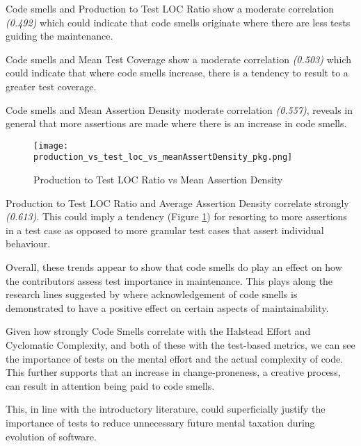 Code smells and Production to Test LOC Ratio show a moderate correlation \textit{(0.492)} which could indicate that code smells originate where there are less tests guiding the maintenance. 

Code smells and Mean Test Coverage show a moderate correlation \textit{(0.503)} which could indicate that where code smells increase, there is a tendency to result to a greater test coverage. 

Code smells and Mean Assertion Density moderate correlation \textit{(0.557)}, reveals in general that more assertions are made where there is an increase in code smells. 

\begin{figure}[H]
	\texttt{[image: production\_vs\_test\_loc\_vs\_meanAssertDensity\_pkg.png]}
	\caption{Production to Test LOC Ratio vs Mean Assertion Density}
	\label{fig:prodtestRatioVsMeanAssertDensity}  
\end{figure}

Production to Test LOC Ratio and Average Assertion Density correlate strongly \textit{(0.613)}. This could imply a tendency (Figure \ref{fig:prodtestRatioVsMeanAssertDensity}) for resorting to more assertions in a test case as opposed to more granular test cases that assert individual behaviour.

Overall, these trends appear to show that code smells do play an effect on how the contributors assess test importance in maintenance. This plays along the research lines suggested by \textcite{palomba2018diffuseness} where acknowledgement of code smells is demonstrated to have a positive effect on certain aspects of maintainability.

Given how strongly Code Smells correlate with the Halstead Effort and Cyclomatic Complexity, and both of these with the test-based metrics, we can see the importance of tests on the mental effort and the actual complexity of code. This further supports that an increase in change-proneness, a creative process, can result in attention being paid to code smells. 

This, in line with the introductory literature, could superficially justify the importance of tests to reduce unnecessary future mental taxation during evolution of software. 